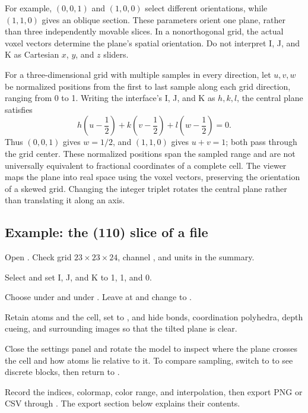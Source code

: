 For example, $(0,0,1)$ and $(1,0,0)$ select different orientations, while $(1,1,0)$ gives an oblique section. These parameters orient one plane, rather than three independently movable slices. In a nonorthogonal grid, the actual voxel vectors determine the plane's spatial orientation. Do not interpret I, J, and K as Cartesian $x$, $y$, and $z$ sliders.

For a three-dimensional grid with multiple samples in every direction, let $u,v,w$ be normalized positions from the first to last sample along each grid direction, ranging from 0 to 1. Writing the interface's I, J, and K as $h,k,l$, the central plane satisfies
\begin{equation}
  h\left(u-\frac12\right)
  +k\left(v-\frac12\right)
  +l\left(w-\frac12\right)=0.
  \label{eq:volume-central-miller}
\end{equation}
Thus $(0,0,1)$ gives $w=1/2$, and $(1,1,0)$ gives $u+v=1$; both pass through the grid center. These normalized positions span the sampled range and are not universally equivalent to fractional coordinates of a complete cell. The viewer maps the plane into real space using the voxel vectors, preserving the orientation of a skewed grid. Changing the integer triplet rotates the central plane rather than translating it along an axis.

\subsection{Example: the (110) slice of a  file}

\begin{steps}
  \item Open . Check grid $23\times23\times24$, channel , and units  in the summary.
  \item Select  and set I, J, and K to 1, 1, and 0.
  \item Choose  under  and  under . Leave  at  and change  to .
  \item Retain atoms and the cell, set  to , and hide bonds, coordination polyhedra, depth cueing, and surrounding images so that the tilted plane is clear.
  \item Close the settings panel and rotate the model to inspect where the plane crosses the cell and how atoms lie relative to it. To compare sampling, switch to  to see discrete blocks, then return to .
  \item Record the indices, colormap, color range, and interpolation, then export PNG or CSV through . The export section below explains their contents.
\end{steps}

